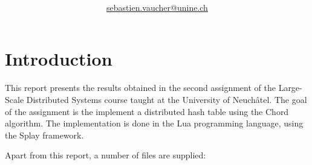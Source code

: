 \documentclass[11pt,a4paper]{scrartcl}
\author{\myauthor\\ \href{mailto:sebastien.vaucher@unine.ch}{sebastien.vaucher@unine.ch}}
\title{\huge \textbf{\mytitle}}
\begin{document}
\nocite{*}

\begin{titlingpage}

\begin{otherlanguage}{australian}
\maketitle
\end{otherlanguage}

\tableofcontents

\begin{table}[b]
\centering
{}
\qquad\qquad
{}
\end{table}

\end{titlingpage}

\pagebreak

\section{Introduction}

This report presents the results obtained in the second assignment of the Large-Scale Distributed Systems course taught at the University of Neuchâtel. The goal of the assignment is the implement a distributed hash table using the Chord algorithm. The implementation is done in the Lua programming language, using the Splay framework.

Apart from this report, a number of files are supplied:
\end{document}
